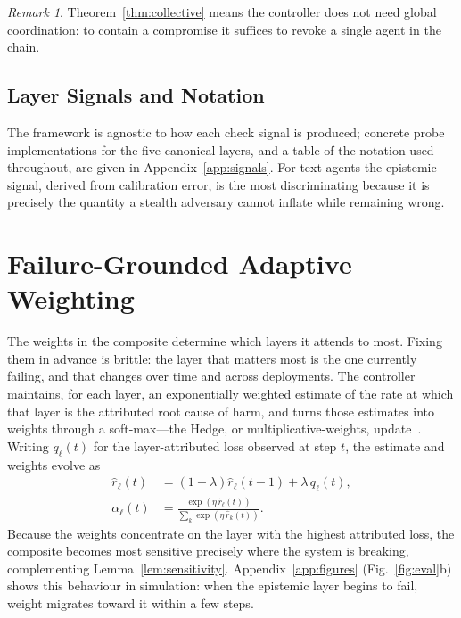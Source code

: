 \documentclass[sigconf,anonymous]{acmart}
\theoremstyle{plain}
\theoremstyle{definition}
\theoremstyle{remark}
\newtheorem{remark}{Remark}
\begin{document}
\begin{remark}
Theorem~\ref{thm:collective} means the controller does not need global coordination: to
contain a compromise it suffices to revoke a single agent in the chain.
\end{remark}

\subsection{Layer Signals and Notation}
\label{sec:signals}
The framework is agnostic to how each check signal is produced; concrete probe
implementations for the five canonical layers, and a table of the notation used
throughout, are given in Appendix~\ref{app:signals}. For text agents the epistemic
signal, derived from calibration error, is the most discriminating because it is
precisely the quantity a stealth adversary cannot inflate while remaining wrong.

\section{Failure-Grounded Adaptive Weighting}
\label{sec:weights}
The weights in the composite determine which layers it attends to most. Fixing them in
advance is brittle: the layer that matters most is the one currently failing, and that
changes over time and across deployments. The controller maintains, for each layer, an
exponentially weighted estimate of the rate at which that layer is the attributed root
cause of harm, and turns those estimates into weights through a soft-max---the Hedge, or
multiplicative-weights, update~\cite{freund1997decision,arora2012mw}. Writing $q_\ell(t)$
for the layer-attributed loss observed at step $t$, the estimate and weights evolve as
\begin{align}
\hat r_\ell(t) &= (1-\lambda)\hat r_\ell(t-1)+\lambda\,q_\ell(t),
\label{eq:ewma}\\
\alpha_\ell(t) &= \frac{\exp(\eta\,\hat r_\ell(t))}{\sum_k\exp(\eta\,\hat r_k(t))}.
\label{eq:hedge}
\end{align}
Because the weights concentrate on the layer with the highest attributed loss, the
composite becomes most sensitive precisely where the system is breaking, complementing
Lemma~\ref{lem:sensitivity}. Appendix~\ref{app:figures} (Fig.~\ref{fig:eval}b) shows this
behaviour in simulation: when the epistemic layer begins to fail, weight migrates toward
it within a few steps.
\end{document}
